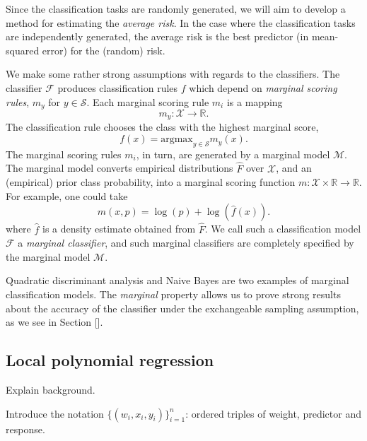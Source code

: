 \documentclass[12pt]{article}
\begin{document}
Since the classification tasks are randomly generated, we will aim to
develop a method for estimating the \emph{average risk}.  In the case
where the classification tasks are independently generated, the
average risk is the best predictor (in mean-squared error) for the
(random) risk.

We make some rather strong assumptions with regards to the
classifiers.  The classifier $\mathcal{F}$ produces classification
rules $f$ which depend on \emph{marginal scoring rules}, $m_y$ for $y
\in \mathcal{S}$.  Each marginal scoring rule $m_i$ is a mapping
\[
m_y: \mathcal{X} \to \mathbb{R}.
\]
The classification rule chooses the class with the highest marginal score,
\[
f(x) = \text{argmax}_{y \in \mathcal{S}} m_y(x).
\]
The marginal scoring rules $m_i$, in turn, are generated by a marginal
model $\mathcal{M}$.  The marginal model converts empirical
distributions $\hat{F}$ over $\mathcal{X}$, and an (empirical) prior
class probability, into a marginal scoring function $m: \mathcal{X}
\times \mathbb{R} \to \mathbb{R}$.  For example, one could take 
\[m(x,p) = \log(p) + \log(\hat{f}(x)).\]
where $\hat{f}$ is a density estimate obtained from
$\hat{F}$.  We call such a classification model $\mathcal{F}$ a
\emph{marginal classifier}, and such marginal classifiers are
completely specified by the marginal model $\mathcal{M}.$

Quadratic discriminant analysis and Naive Bayes are two examples of
marginal classification models.
The \emph{marginal} property allows us to prove strong results about
the accuracy of the classifier under the exchangeable sampling
assumption, as we see in Section [].

\subsection{Local polynomial regression}

Explain background.

Introduce the notation $\{(w_i, x_i, y_i)\}_{i=1}^n$: ordered triples
of weight, predictor and response.
\end{document}
